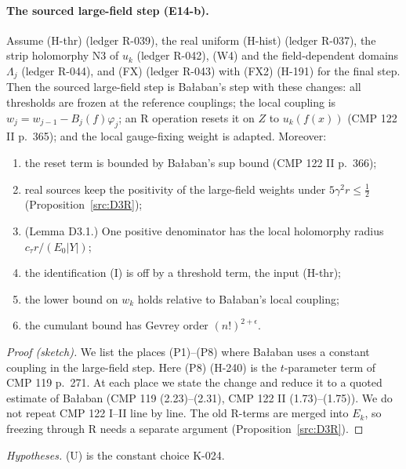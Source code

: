 \paragraph{The sourced large-field step (E14-b).}

\begin{proposition}\label{src:D3}
Assume (H-thr) (ledger R-039), the real uniform (H-hist) (ledger R-037), the strip holomorphy N3 of $u_k$ (ledger R-042), (W4) and the field-dependent domains $\Lambda_j$ (ledger R-044), and (FX) (ledger R-043) with (FX2) (H-191) for the final step. Then the sourced large-field step is Ba{\l}aban's step with these changes: all thresholds are frozen at the reference couplings; the local coupling is $w_j=w_{j-1}-B_j(f)\varphi_j$; an R operation resets it on $Z$ to $u_k(f(x))$ (CMP 122 II p.~365); and the local gauge-fixing weight is adapted. Moreover:
\begin{enumerate}
\item[(a)] the reset term is bounded by Ba{\l}aban's sup bound (CMP 122 II p.~366);
\item[(b)] real sources keep the positivity of the large-field weights under $5\gamma^2r\le\tfrac12$ (Proposition~\ref{src:D3R});
\item[(c)] (Lemma D3.1.) One positive denominator has the local holomorphy radius $c_\tau r/(E_0|Y|)$;
\item[(d)] the identification (I) is off by a threshold term, the input (H-thr);
\item[(e)] the lower bound on $w_k$ holds relative to Ba{\l}aban's local coupling;
\item[(f)] the cumulant bound has Gevrey order $(n!)^{2+\epsilon}$.
\end{enumerate}
\end{proposition}

\begin{proof}[Proof (sketch)]
We list the places (P1)--(P8) where Ba{\l}aban uses a constant coupling in the large-field step. Here (P8) (H-240) is the $t$-parameter term of CMP 119 p.~271. At each place we state the change and reduce it to a quoted estimate of Ba{\l}aban (CMP 119 (2.23)--(2.31), CMP 122 II (1.73)--(1.75)). We do not repeat CMP 122 I--II line by line. The old R-terms are merged into $E_k$, so freezing through R needs a separate argument (Proposition~\ref{src:D3R}).
\end{proof}

\emph{Hypotheses.} (U) is the constant choice K-024.

